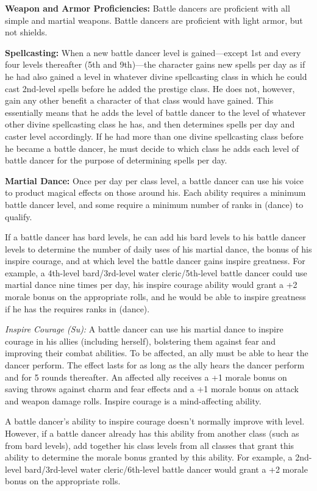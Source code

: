 {
\textbf{Weapon and Armor Proficiencies:} Battle dancers are proficient with all simple and martial weapons. Battle dancers are proficient with light armor, but not shields.

\textbf{Spellcasting:} When a new battle dancer level is gained---except 1st and every four levels thereafter (5th and 9th)---the character gains new spells per day as if he had also gained a level in whatever divine spellcasting class in which he could cast 2nd-level spells before he added the prestige class. He does not, however, gain any other benefit a character of that class would have gained. This essentially means that he adds the level of battle dancer to the level of whatever other divine spellcasting class he has, and then determines spells per day and caster level accordingly. If he had more than one divine spellcasting class before he became a battle dancer, he must decide to which class he adds each level of battle dancer for the purpose of determining spells per day.

\textbf{Martial Dance:} Once per day per class level, a battle dancer can use his voice to product magical effects on those around his. Each ability requires a minimum battle dancer level, and some require a minimum number of ranks in  (dance) to qualify.

If a battle dancer has bard levels, he can add his bard levels to his battle dancer levels to determine the number of daily uses of his martial dance, the bonus of his inspire courage, and at which level the battle dancer gains inspire greatness. For example, a 4th-level bard/3rd-level water cleric/5th-level battle dancer could use martial dance nine times per day, his inspire courage ability would grant a +2 morale bonus on the appropriate rolls, and he would be able to inspire greatness if he has the requires ranks in  (dance).

\textit{Inspire Courage (Su):} A battle dancer can use his martial dance to inspire courage in his allies (including herself), bolstering them against fear and improving their combat abilities. To be affected, an ally must be able to hear the dancer perform. The effect lasts for as long as the ally hears the dancer perform and for 5 rounds thereafter. An affected ally receives a +1 morale bonus on saving throws against charm and fear effects and a +1 morale bonus on attack and weapon damage rolls. Inspire courage is a mind-affecting ability.

A battle dancer's ability to inspire courage doesn't normally improve with level. However, if a battle dancer already has this ability from another class (such as from bard levels), add together his class levels from all classes that grant this ability to determine the morale bonus granted by this ability. For example, a 2nd-level bard/3rd-level water cleric/6th-level battle dancer would grant a +2 morale bonus on the appropriate rolls.

}
